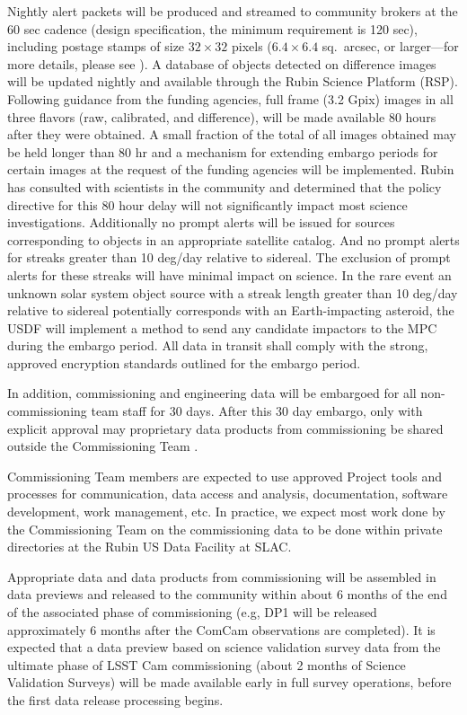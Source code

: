 Nightly alert packets will be produced and streamed to community brokers at the 60 sec cadence (design specification, the minimum requirement is 120 sec), including postage stamps of size $32 \times 32$ pixels ($6.4 \times 6.4$ sq.\ \gls{arcsec}, or larger---for more details, please see ).
A database of objects detected on difference images will be updated nightly and available through the Rubin Science Platform (\gls{RSP}).
Following guidance from the funding agencies, full frame (3.2 Gpix) images in all three flavors (raw, calibrated, and difference), will be made available 80 hours after they were obtained.
A small fraction of the total of all images obtained may be held longer than 80 hr and a mechanism for extending embargo periods for certain images at the request of the funding agencies will be implemented.
Rubin has consulted with scientists in the community and determined that the policy directive for this 80 hour delay will not significantly impact most science investigations.
Additionally no prompt alerts will be issued for sources corresponding to objects in an appropriate satellite catalog.
And no prompt alerts for streaks greater than 10 \gls{deg}/day relative to sidereal.
The exclusion of prompt alerts for these streaks will have minimal impact on science.
In the rare event an unknown solar system object source with a streak length greater than 10 \gls{deg}/day relative to sidereal potentially corresponds with an Earth-impacting asteroid, the \gls{USDF} will implement a method to send any candidate impactors to the \gls{MPC} during the embargo period.
All data in transit shall comply with the strong, approved encryption standards outlined for the embargo period.

In addition, commissioning and engineering data will be embargoed for all non-commissioning team staff for 30 days.
After this 30 day embargo, only with explicit approval may proprietary data products from commissioning be shared outside the \gls{Commissioning} Team   .

Commissioning Team members are expected to use approved Project tools and processes for communication, data access and analysis, documentation, \gls{software} development, work management, etc.
In practice, we expect most work done by the \gls{Commissioning} Team on the commissioning data to be done within private directories at the Rubin US Data Facility at SLAC.

Appropriate data and data products from commissioning will be assembled in data previews  and released to the community within about 6 months of the end of the associated phase of commissioning (e.g, DP1 will be released approximately 6 months after the \gls{ComCam} observations are completed).
It is expected that a data preview based on science validation survey data from the ultimate phase of LSST Cam commissioning (about 2 months of Science \gls{Validation} Surveys) will be made available early in full survey operations, before the first data release processing begins.

